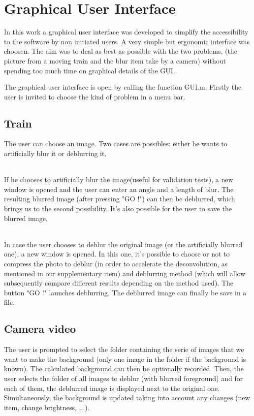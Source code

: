 
\chapter{Graphical User Interface}

In this work a graphical user interface was developed to simplify the accessibility to the software by non initiated users. A very simple but ergonomic interface was choosen. The aim was to deal as best as possible with the two problems, (the picture from a moving train and the blur item take by a camera) without spending too much time on graphical details of the GUI.


The graphical user interface is open by calling the function GUI.m. Firstly the user is invited to choose the kind of problem in a menu bar.


\section{Train}

The user can choose an image. Two cases are possibles: either he wants to artificially blur it or deblurring it. 

\\
If he chooses to artificially blur the image(useful for validation tests), a new window is opened and the user can enter an angle and a length of blur. The resulting blurred image (after pressing "GO !") can then be deblurred, which brings us to the second possibility. It's also possible for the user to save the blurred image.

\\
In case the user chooses to deblur the original image (or the artificially blurred one), a new window is opened. In this one, it's possible to choose or not to compress the photo to deblur (in order to accelerate the deconvolution,  as mentioned in our supplementary item) and deblurring method  (which will allow subsequently compare different results depending on the method used). The button "GO !" launches deblurring. The deblurred image can finally be save in a file.

\section{Camera video}

The user is prompted to select the folder containing the serie of images that we want to make the background (only one image in the folder if the background is known). The calculated background can then be optionally recorded.
Then, the user selects the folder of all images to deblur (with blurred foreground) and for each of them, the deblurred image is displayed next to the original one. Simultaneously, the background is updated taking into account any changes (new item, change brightness, ...).

